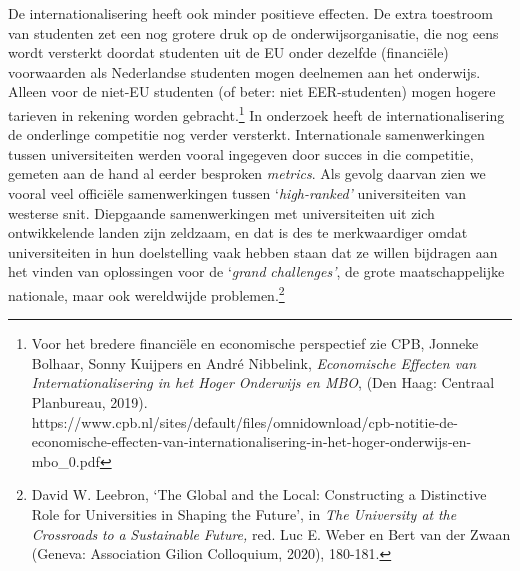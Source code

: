 \documentclass[smallauthor, chapterhaspagenum, nochapterinheader, pagenuminheader,  bigchapnum,medium2, tocpages,  garamond, titleinheader]{jote-book}
\begin{document}
	De internationalisering heeft ook minder positieve effecten. De extra toestroom van studenten zet een nog grotere druk op de onderwijsorganisatie, die nog eens wordt versterkt doordat studenten uit de EU onder dezelfde (financiële) voorwaarden als Nederlandse studenten mogen deelnemen aan het onderwijs. Alleen voor de niet-EU studenten (of beter: niet EER-studenten) mogen hogere tarieven in rekening worden gebracht.\footnote{Voor het bredere financiële en economische perspectief zie CPB, Jonneke Bolhaar, Sonny Kuijpers en André Nibbelink, \emph{Economische Effecten van Internationalisering in het Hoger Onderwijs en MBO}, (Den Haag: Centraal Planbureau, 2019). https://www.cpb.nl/sites/default/files/omnidownload/cpb-notitie-de-economische-effecten-van-internationalisering-in-het-hoger-onderwijs-en-mbo\_0.pdf} In onderzoek heeft de internationalisering de onderlinge competitie nog verder versterkt. Internationale samenwerkingen tussen universiteiten werden vooral ingegeven door succes in die competitie, gemeten aan de hand al eerder besproken \emph{metrics}. Als gevolg daarvan zien we vooral veel officiële samenwerkingen tussen ‘\emph{high-}\emph{ranked}\emph{'}\emph{ }universiteiten van westerse snit. Diepgaande samenwerkingen met universiteiten uit zich ontwikkelende landen zijn zeldzaam, en dat is des te merkwaardiger omdat universiteiten in hun doelstelling vaak hebben staan dat ze willen bijdragen aan het vinden van oplossingen voor de ‘\emph{grand }\emph{challenges}\emph{'}, de grote maatschappelijke nationale, maar ook wereldwijde problemen.\footnote{David W. Leebron, ‘The Global and the Local: Constructing a Distinctive Role for Universities in Shaping the Future', in \emph{The University at }\emph{the}\emph{ Crossroads }\emph{to}\emph{ a }\emph{Sustainable}\emph{ }\emph{Future}\emph{,} red. Luc E. Weber en Bert van der Zwaan (Geneva: Association Gilion Colloquium, 2020), 180-181.}
\end{document}
